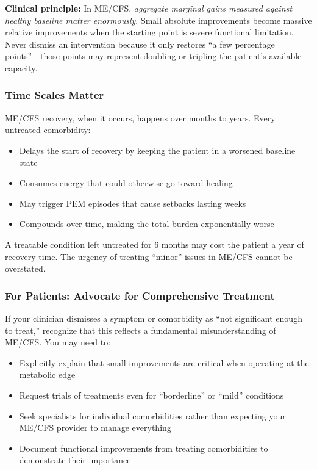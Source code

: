 \textbf{Clinical principle:} In ME/CFS, \textit{aggregate marginal gains measured against healthy baseline matter enormously}. Small absolute improvements become massive relative improvements when the starting point is severe functional limitation. Never dismiss an intervention because it only restores ``a few percentage points''---those points may represent doubling or tripling the patient's available capacity.

\subsubsection{Time Scales Matter}

ME/CFS recovery, when it occurs, happens over months to years. Every untreated comorbidity:

\begin{itemize}
    \item Delays the start of recovery by keeping the patient in a worsened baseline state
    \item Consumes energy that could otherwise go toward healing
    \item May trigger PEM episodes that cause setbacks lasting weeks
    \item Compounds over time, making the total burden exponentially worse
\end{itemize}

A treatable condition left untreated for 6 months may cost the patient a year of recovery time. The urgency of treating ``minor'' issues in ME/CFS cannot be overstated.

\subsubsection{For Patients: Advocate for Comprehensive Treatment}

If your clinician dismisses a symptom or comorbidity as ``not significant enough to treat,'' recognize that this reflects a fundamental misunderstanding of ME/CFS. You may need to:

\begin{itemize}
    \item Explicitly explain that small improvements are critical when operating at the metabolic edge
    \item Request trials of treatments even for ``borderline'' or ``mild'' conditions
    \item Seek specialists for individual comorbidities rather than expecting your ME/CFS provider to manage everything
    \item Document functional improvements from treating comorbidities to demonstrate their importance
\end{itemize}


